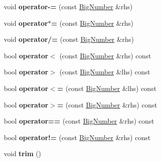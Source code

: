 \begin{DoxyCompactItemize}
void {\bfseries operator-\/=} (const \mbox{\hyperlink{class_big_number}{Big\+Number}} \&rhs)
\item 
\mbox{\label{class_big_number_a01c0aaf31a468cdaacae6e7360400ed1}} 
void {\bfseries operator$\ast$=} (const \mbox{\hyperlink{class_big_number}{Big\+Number}} \&rhs)
\item 
\mbox{\label{class_big_number_a3e764bf9705be30c19981e6b368c0d27}} 
void {\bfseries operator/=} (const \mbox{\hyperlink{class_big_number}{Big\+Number}} \&rhs)
\item 
\mbox{\label{class_big_number_aeed73287f49e6b7d8d4143f88847adef}} 
bool {\bfseries operator$<$} (const \mbox{\hyperlink{class_big_number}{Big\+Number}} \&rhs) const
\item 
\mbox{\label{class_big_number_a8cdccc6020e04371601db8d005781566}} 
bool {\bfseries operator$>$} (const \mbox{\hyperlink{class_big_number}{Big\+Number}} \&lhs) const
\item 
\mbox{\label{class_big_number_affaff862993d39a5be41e1fbd17744fb}} 
bool {\bfseries operator$<$=} (const \mbox{\hyperlink{class_big_number}{Big\+Number}} \&lhs) const
\item 
\mbox{\label{class_big_number_a514acf91b457b09aa98b338500b51cb2}} 
bool {\bfseries operator$>$=} (const \mbox{\hyperlink{class_big_number}{Big\+Number}} \&rhs) const
\item 
\mbox{\label{class_big_number_a3f3db69403467941496832bb182a0e4d}} 
bool {\bfseries operator==} (const \mbox{\hyperlink{class_big_number}{Big\+Number}} \&rhs) const
\item 
\mbox{\label{class_big_number_aead08a5393e7670827cdac2b6c7aa5a4}} 
bool {\bfseries operator!=} (const \mbox{\hyperlink{class_big_number}{Big\+Number}} \&rhs) const
\item 
\mbox{\label{class_big_number_a58ebab030e33e402e785723d9cb3e8da}} 
void {\bfseries trim} ()
\item 
\mbox{\label{class_big_number_aab6056f84b25b6a4353f92d3c5af6148}} 

\end{DoxyCompactItemize}
